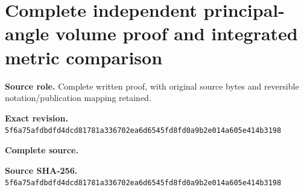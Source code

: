 \begingroup
\sloppy
\small
\section{Complete independent principal-angle volume proof and integrated metric comparison}
\noindent\textbf{Source role.} Complete written proof, with original source bytes and reversible notation/publication mapping retained.\par
\noindent\textbf{Exact revision.} \nolinkurl{5f6a75afdbdfd4dcd81781a336702ea6d6545fd8fd0a9b2e014a605e414b3198}\par
\noindent\textbf{Complete source.} \par
\noindent\textbf{Source SHA-256.} \nolinkurl{5f6a75afdbdfd4dcd81781a336702ea6d6545fd8fd0a9b2e014a605e414b3198}\par\medskip

\endgroup
